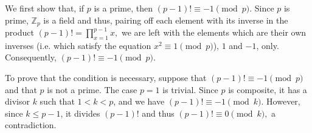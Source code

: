 \documentclass[12pt]{article}
\renewcommand{\leq}{\leqslant}
\begin{document}

We first show that, if $p$ is a prime, then $(p-1)! \equiv -1 \pmod p.$ Since $p$ is prime, $\mathbb{Z}_p$ is a field and thus, pairing off each element with its inverse in the product $(p-1)! = \prod_{x=1}^{p-1}x,$ we are left with the elements which are their own inverses (i.e. which satisfy the equation $x^2 \equiv 1 \pmod p$), $1$ and $-1$, only. Consequently, $(p-1)! \equiv -1 \pmod p.$

To prove that the condition is necessary, suppose that $(p-1)! \equiv -1 \pmod p$ and that $p$ is not a prime. The case $p=1$ is trivial. Since $p$ is composite, it has a divisor $k$ such that $1 < k < p$, and we have $(p-1)! \equiv -1 \pmod k$. However, since $k\leq p-1$, it divides $(p-1)!$ and thus $(p-1)! \equiv 0 \pmod k,$ a contradiction.
\end{document}
